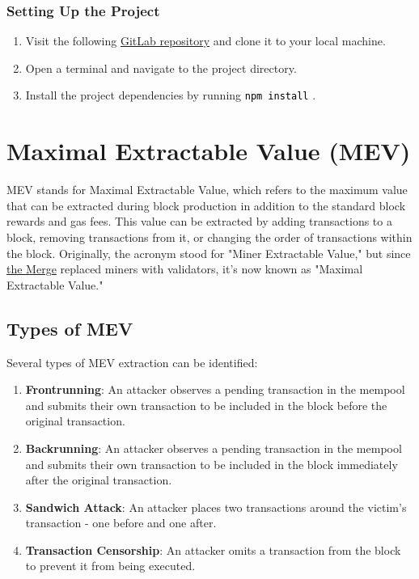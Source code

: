 \documentclass[12pt]{article}
\newcommand{\codegrey}[1]{%
  \texttt{\colorbox{black!4}{\textcolor{black}{#1}}}%
}
\begin{document}
\subsubsection*{Setting Up the Project}

\begin{enumerate}
    \item Visit the following \href{https://gitlab.fel.cvut.cz/radovluk/smart-contracts-exercises/-/tree/main/08-Maximal-Extractable-Value/task/task-code}{GitLab repository} and clone it to your local machine.
    \item Open a terminal and navigate to the project directory.
    \item Install the project dependencies by running \codegrey{npm install}.
\end{enumerate}

\section{Maximal Extractable Value (MEV)}

MEV stands for Maximal Extractable Value, which refers to the maximum value that can be extracted during block production in addition to the standard block rewards and gas fees. This value can be extracted by adding transactions to a block, removing transactions from it, or changing the order of transactions within the block. Originally, the acronym stood for "Miner Extractable Value," but since \href{https://ethereum.org/en/roadmap/merge/}{the Merge} replaced miners with validators, it's now known as "Maximal Extractable Value."

\subsection*{Types of MEV}

Several types of MEV extraction can be identified:

\begin{enumerate}
  \item \textbf{Frontrunning}: An attacker observes a pending transaction in the mempool and submits their own transaction to be included in the block before the original transaction.
  \item \textbf{Backrunning}: An attacker observes a pending transaction in the mempool and submits their own transaction to be included in the block immediately after the original transaction.
  \item \textbf{Sandwich Attack}: An attacker places two transactions around the victim's transaction - one before and one after.
  \item \textbf{Transaction Censorship}: An attacker omits a transaction from the block to prevent it from being executed.
\end{enumerate}
\end{document}

